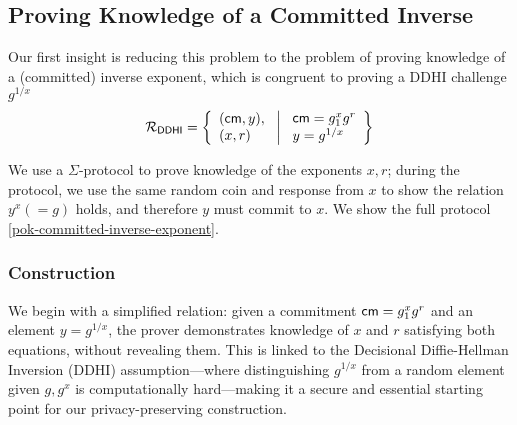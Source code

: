 \subsection{Proving Knowledge of a Committed Inverse}
Our first insight is reducing this problem to the problem of proving knowledge of a (committed) inverse exponent, which is congruent to proving a DDHI challenge $g^{1/x}$
\[
\mathcal{R}_{\mathsf{DDHI}} = \left\{ 
\begin{array}{l} (\mathsf{cm}, y),\\
(x, r) 
\end{array}
\ \middle|
\ \begin{array}{l}
\mathsf{cm} = g_1^{x} g^r \\
y = g^{1/x} \\
\end{array} \right\}
\]

We use a $\Sigma$-protocol to prove knowledge of the exponents $x, r$; during the protocol, we use the same random coin and response from $x$ to show the relation $y^x (=g)$ holds, and therefore $y$ must commit to $x$. We show the full protocol \ref{pok-committed-inverse-exponent}. 




\subsubsection{Construction}

We begin with a simplified relation: given a commitment $\mathsf{cm} = g_1^x g^r$ and an element $y = g^{1/x}$, the prover demonstrates knowledge of $x$ and $r$ satisfying both equations, without revealing them. This is linked to the Decisional Diffie-Hellman Inversion (DDHI) assumption—where distinguishing $g^{1/x}$ from a random element given $g, g^x$ is computationally hard—making it a secure and essential starting point for our privacy-preserving construction.


